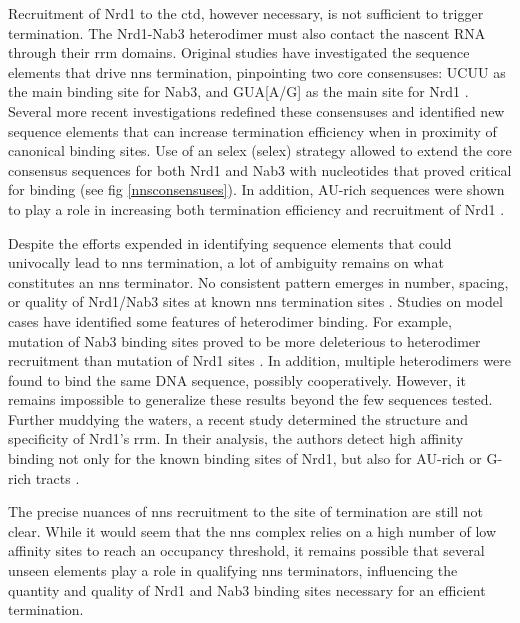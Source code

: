 Recruitment of Nrd1 to the \gls{ctd}, however necessary, is not sufficient to trigger termination.
The Nrd1-Nab3 heterodimer must also contact the nascent RNA through their \gls{rrm} domains.
Original studies have investigated the sequence elements that drive \gls{nns} termination, pinpointing two core consensuses: UCUU as the main binding site for Nab3, and GUA[A/G] as the main site for Nrd1 \cite{carroll:2004:identification}.
Several more recent investigations redefined these consensuses and identified new sequence elements that can increase termination efficiency when in proximity of canonical binding sites.
Use of an \invivo{} \gls{selex} (\glsdesc{selex}) strategy allowed to extend the core consensus sequences for both Nrd1 and Nab3 with nucleotides that proved critical for binding (see fig \ref{nnsconsensuses}).
In addition, AU-rich sequences were shown to play a role in increasing both termination efficiency and recruitment of Nrd1 \citep{porrua:2012:in}.

Despite the efforts expended in identifying sequence elements that could univocally lead to \gls{nns} termination, a lot of ambiguity remains on what constitutes an \gls{nns} terminator.
No consistent pattern emerges in number, spacing, or quality of Nrd1/Nab3 sites at known \gls{nns} termination sites \invivo{}. 
Studies on model cases have identified some features of heterodimer binding. 
For example, mutation of Nab3 binding sites proved to be more deleterious to heterodimer recruitment than mutation of Nrd1 sites \cite{carroll:2007:interaction}.
In addition, multiple heterodimers were found to bind the same DNA sequence, possibly cooperatively\cite{carroll:2007:interaction}.
However, it remains impossible to generalize these results beyond the few sequences tested.
Further muddying the waters, a recent \invitro{} study determined the structure and specificity of Nrd1's \gls{rrm}.
In their analysis, the authors detect high affinity binding not only for the known binding sites of Nrd1, but also for AU-rich or G-rich tracts \cite{bacikova:2014:structure}.

The precise nuances of \gls{nns} recruitment to the site of termination are still not clear. 
While it would seem that the \gls{nns} complex relies on a high number of low affinity sites to reach an occupancy threshold, it remains possible that several unseen elements play a role in qualifying \gls{nns} terminators, influencing the quantity and quality of Nrd1 and Nab3 binding sites necessary for an efficient termination.


